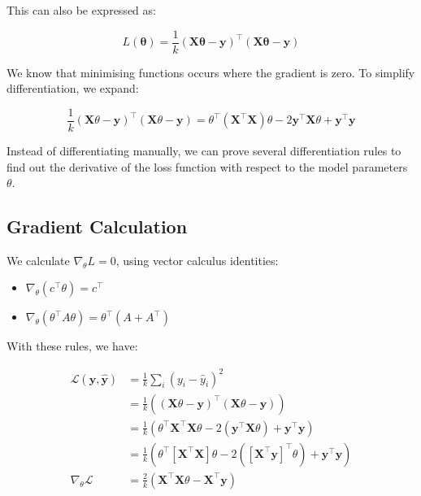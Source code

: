 This can also be expressed as:

\[
    L(\bm{\theta}) = \frac{1}{k} (\bm{X} \bm{\theta} - \bm{y})^\top (\bm{X} \bm{\theta} - \bm{y})
\]

We know that minimising functions occurs where the gradient is zero. To simplify differentiation, we expand:

\[
    \frac{1}{k} (\bm{X} \theta - \bm{y})^\top (\bm{X} \theta - \bm{y})
    = \theta^\top (\bm{X}^\top \bm{X}) \theta - 2 \bm{y}^\top \bm{X} \theta + \bm{y}^\top \bm{y}
\]


Instead of differentiating manually, we can prove several differentiation rules to find out the derivative of the loss function with respect to the model parameters $\theta$.

\subsection{Gradient Calculation}

We calculate \( \nabla_\theta L = 0 \), using vector calculus identities:

\begin{itemize}
    \item \( \nabla_\theta (c^\top \theta) = c^\top \)
    \item \( \nabla_\theta (\theta^\top A \theta) = \theta^\top (A + A^\top) \)
\end{itemize}

With these rules, we have:

\begin{align}
    \mathcal{L}(\bm{y}, \hat{\bm{y}}) & = \frac{1}{k} \sum_i \left( y_i - \hat{y}_i \right)^2                                                                                          \\
                                      & = \frac{1}{k} \left( (\bm{X}\theta - \bm{y})^\top (\bm{X}\theta - \bm{y}) \right)                                                              \\
                                      & = \frac{1}{k} \left( \theta^\top \bm{X}^\top \bm{X} \theta - 2 (\bm{y}^\top \bm{X} \theta) + \bm{y}^\top \bm{y} \right)                        \\
                                      & = \frac{1}{k} \left( \theta^\top \left[ \bm{X}^\top \bm{X} \right] \theta - 2 ([\bm{X}^\top \bm{y}]^ \top \theta) + \bm{y}^\top \bm{y} \right) \\
    \nabla_\theta \mathcal{L}         & = \frac{2}{k} \left( \bm{X}^\top \bm{X} \theta - \bm{X}^\top \bm{y} \right)
\end{align}

